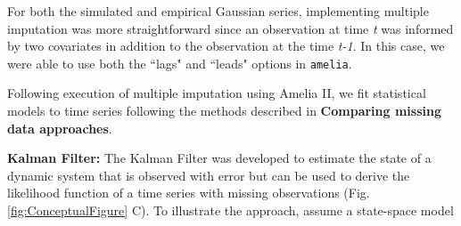 \documentclass{article}
\begin{document}
For both the simulated and empirical Gaussian series, implementing multiple imputation was more straightforward since an observation at time \textit{t} was informed by two covariates in addition to the observation at the time \textit{t-1}. In this case, we were able to use both the ``lags" and ``leads" options in \texttt{amelia}. 

Following execution of multiple imputation using Amelia II, we fit statistical models to time series following the methods described in \textbf{Comparing missing data approaches}. 

\noindent\textbf{Kalman Filter:} The Kalman Filter was developed to estimate the state of a dynamic system that is observed with error but can be used to derive the likelihood function of a time series with missing observations (Fig. \ref{fig:ConceptualFigure} C). To illustrate the approach, assume a state-space model
\end{document}
